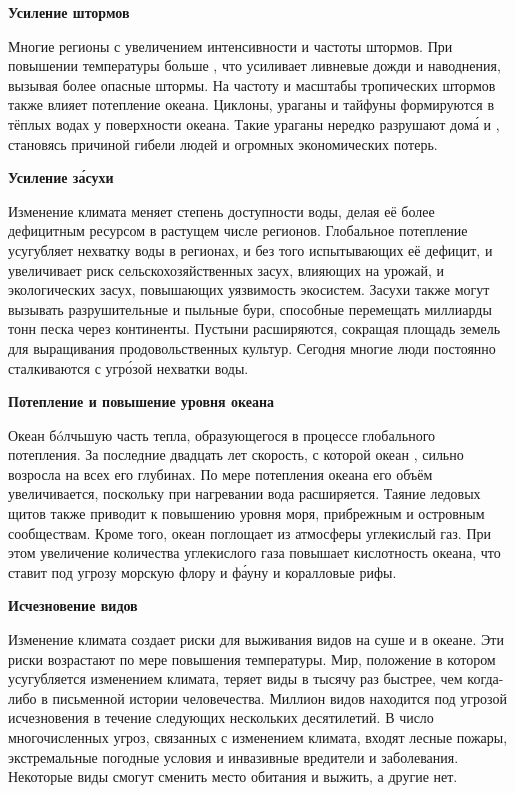 \textbf{Усиление штормов}

Многие регионы  с увеличением интенсивности и частоты  штормов. При повышении температуры  больше , что усиливает ливневые дожди и наводнения, вызывая более опасные штормы. На частоту и масштабы тропических штормов также влияет потепление океана. Циклоны, ураганы и тайфуны формируются в тёплых водах у поверхности океана. Такие ураганы нередко разрушают дом\'{а} и , становясь причиной гибели людей и огромных экономических потерь.

\textbf{Усиление з\'{а}сухи}

Изменение климата меняет степень доступности воды, делая её более дефицитным ресурсом в растущем числе регионов. Глобальное потепление усугубляет нехватку воды в регионах, и без того испытывающих её дефицит, и увеличивает риск сельскохозяйственных засух, влияющих на урожай, и экологических засух, повышающих уязвимость экосистем. Засухи также могут вызывать разрушительные  и пыльные бури, способные перемещать миллиарды тонн песка через континенты. Пустыни расширяются, сокращая площадь земель для выращивания продовольственных культур. Сегодня многие люди постоянно сталкиваются с угр\'{о}зой нехватки воды.

\textbf{Потепление и повышение уровня океана}

Океан  бóлчьшую часть тепла, образующегося в процессе глобального потепления. За последние двадцать лет скорость, с которой океан , сильно возросла на всех его глубинах. По мере потепления океана его объём увеличивается, поскольку при нагревании вода расширяется. Таяние ледовых щитов также приводит к повышению уровня моря,  прибрежным и островным сообществам. Кроме того, океан поглощает из атмосферы углекислый газ. При этом увеличение количества углекислого газа повышает кислотность океана, что ставит под угрозу морскую флору и ф\'{а}уну и коралловые рифы.

\textbf{Исчезновение видов}

Изменение климата создает риски для выживания видов на суше и в океане. Эти риски возрастают по мере повышения температуры. Мир, положение в котором усугубляется изменением климата, теряет виды в тысячу раз быстрее, чем когда-либо в письменной истории человечества. Миллион видов находится под угрозой исчезновения в течение следующих нескольких десятилетий. В число многочисленных угроз, связанных с изменением климата, входят лесные пожары, экстремальные погодные условия и инвазивные вредители и заболевания. Некоторые виды смогут сменить место обитания и выжить, а другие нет.

